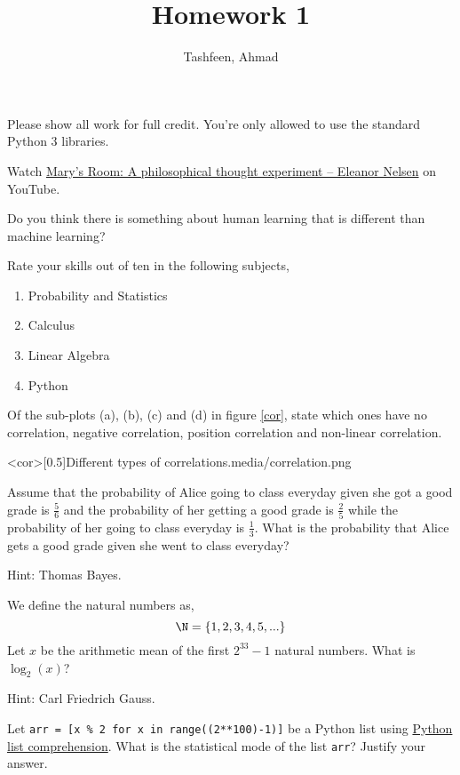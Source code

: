 \documentclass{homework}
\author{Tashfeen, Ahmad}
\title{Homework 1}
\begin{document}
 \maketitle

Please show all work for full credit.  You're only allowed to use the standard Python 3 libraries.

\question Watch \href{https://www.youtube.com/watch?v=mGYmiQkah4o}{Mary's Room: A philosophical thought experiment -- Eleanor Nelsen} on YouTube.

Do you think there is something about human learning that is different than machine learning?


\question Rate your skills out of ten in the following subjects,
\begin{enumerate}
  \item Probability and Statistics
  \item Calculus
  \item Linear Algebra
  \item Python
\end{enumerate}


\question Of the sub-plots (a), (b), (c) and (d) in figure \ref{cor}, state which ones have no correlation, negative correlation, position correlation and non-linear correlation.

\img<cor>[0.5]{Different types of correlations.}{media/correlation.png}


\question Assume that the probability of Alice going to class everyday given she got a good grade is $\frac{5}{6}$ and the probability of her getting a good grade is $\frac{2}{5}$ while the probability of her going to class everyday is $\frac{1}{3}$. What is the probability that Alice gets a good grade given she went to class everyday?

Hint: Thomas Bayes.


\question We define the natural numbers as,
\[
  \N = \{1, 2, 3, 4, 5, ...\}
\]
Let $x$ be the arithmetic mean of the first $2^{33}-1$ natural numbers. What is $\log_2(x)$?

Hint: Carl Friedrich Gauss.


\question Let \texttt{arr = [x \% 2 for x in range((2**100)-1)]} be a Python list using \href{https://www.w3schools.com/python/python_lists_comprehension.asp}{Python list comprehension}. What is the statistical mode of the list \texttt{arr}? Justify your answer.
\end{document}
